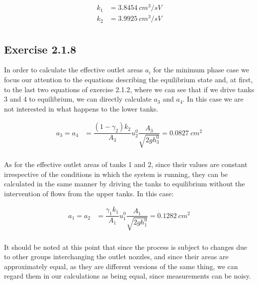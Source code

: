 \begin{align*}
  k_1 &= 3.8454\ cm^3 / sV \\
  k_2 &= 3.9925\ cm^3 / sV\\
\end{align*}


\subsection*{Exercise 2.1.8}

In order to calculate the effective outlet areas $a_i$ for the minimum phase case
we focus our attention to the equations describing the equilibrium state and,
at first, to the last two equations of exercise 2.1.2, where we can see that if
we drive tanks 3 and 4 to equilibrium, we can directly calculate $a_3$ and $a_4$.
In this case we are not interested in what happens to the lower tanks.


\begin{align*}
  a_3 = a_4 &= \dfrac{(1-\gamma_2)k_2}{A_3}u_2^0 \dfrac{A_3}{\sqrt{2gh_3^0}} = 0.0827\ cm^2 \\
\end{align*}

As for the effective outlet areas of tanks 1 and 2, since their values are
constant irrespective of the conditions in which the system is running, they can
be calculated in the same manner by driving the tanks to equilibrium without the
intervention of flows from the upper tanks. In this case:

\begin{align*}
  a_1 = a_2 &= \dfrac{\gamma_1k_1}{A_1}u_1^0 \dfrac{A_1}{\sqrt{2gh_1^0}} = 0.1282\ cm^2 \\
\end{align*}

It should be noted at this point that since the process is subject to changes
due to other groups interchanging the outlet nozzles, and since their areas are
approximately equal, as they are different versions of the same thing, we can
regard them in our calculations as being equal, since measurements can be noisy.
